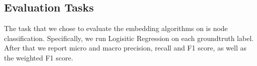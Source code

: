 \subsection{Evaluation Tasks}

The task that we chose to evaluate the embedding algorithms on is node classification. Specifically,
we run Logisitic Regression on each groundtruth label. After that we report micro and macro
precision, recall and F1 score, as well as the weighted F1 score.
